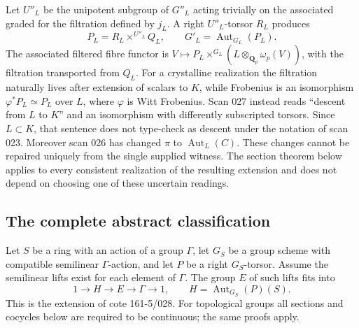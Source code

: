 Let $U''_L$ be the unipotent subgroup of $G''_L$ acting trivially on the
associated graded for the filtration defined by $j_L$.  A right
$U''_L$-torsor $R_L$ produces
\[
 P_L=R_L\mathbin{\times^{U''_L}}Q_L,
 \qquad G'_L=\operatorname{Aut}_{G_L}(P_L).
\]
The associated filtered fibre functor is
$V\mapsto P_L\times^{G_L}(L\otimes_{\mathbf Q_p}\omega_p(V))$,
with the filtration transported from $Q_L$.  For a crystalline realization
the filtration naturally lives after extension of scalars to $K$, while
Frobenius is an isomorphism $\varphi^*P_L\simeq P_L$ over $L$, where
$\varphi$ is Witt Frobenius.  Scan 027 instead reads ``descent from $L$ to
$K$'' and an isomorphism with differently subscripted torsors.  Since
$L\subset K$, that sentence does not type-check as descent under the
notation of scan 023.  Moreover scan 026 has changed $\pi$ to
$\operatorname{Aut}_L(C)$.  These changes cannot be repaired uniquely from
the single supplied witness.  The section theorem below applies to every
consistent realization of the resulting extension and does not depend on
choosing one of these uncertain readings.

\subsection{The complete abstract classification}
Let $S$ be a ring with an action of a group $\Gamma$, let $G_S$ be a group
scheme with compatible semilinear $\Gamma$-action, and let $P$ be a right
$G_S$-torsor.  Assume the semilinear lifts exist for each element of
$\Gamma$.  The group $E$ of such lifts fits into
\[
 1\longrightarrow H\longrightarrow E\longrightarrow\Gamma
 \longrightarrow1,\qquad H=\operatorname{Aut}_{G_S}(P)(S).
\]
This is the extension of cote 161-5/028.  For topological groups all sections
and cocycles below are required to be continuous; the same proofs apply.

